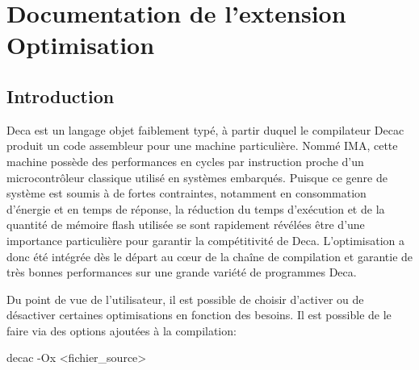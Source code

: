 \documentclass[
]{article}
\author{}
\date{}
\newenvironment{Shaded}{}{}
\newcommand{\NormalTok}[1]{#1}
\begin{document}
\hypertarget{documentation-de-lextension-optimisation}{%
\section{Documentation de l'extension
Optimisation}\label{documentation-de-lextension-optimisation}}

\tableofcontents

\hypertarget{introduction}{%
\subsection{Introduction}\label{introduction}}

Deca est un langage objet faiblement typé, à partir duquel le
compilateur Decac produit un code assembleur pour une machine
particulière. Nommé IMA, cette machine possède des performances en
cycles par instruction proche d'un microcontrôleur classique utilisé en
systèmes embarqués. Puisque ce genre de système est soumis à de fortes
contraintes, notamment en consommation d'énergie et en temps de réponse,
la réduction du temps d'exécution et de la quantité de mémoire flash
utilisée se sont rapidement révélées être d'une importance particulière
pour garantir la compétitivité de Deca. L'optimisation a donc été
intégrée dès le départ au cœur de la chaîne de compilation et garantie
de très bonnes performances sur une grande variété de programmes Deca.

Du point de vue de l'utilisateur, il est possible de choisir d'activer
ou de désactiver certaines optimisations en fonction des besoins. Il est
possible de le faire via des options ajoutées à la compilation:

\begin{Shaded}
\begin{Highlighting}[]
\NormalTok{decac {-}Ox \textless{}fichier\_source\textgreater{}}
\end{Highlighting}
\end{Shaded}
\end{document}
